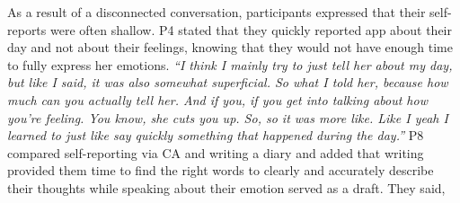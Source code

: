         As a result of a disconnected conversation, participants expressed that their self-reports were often shallow.
        P4 stated that they quickly reported \acl{app} about their day and not about their feelings, knowing that they would not have enough time to fully express her emotions.
                \textit{``I think I mainly try to just tell her about my day, but like I said, it was also somewhat superficial. So what I told her, because how much can you actually tell her. And if you, if you get into talking about how you're feeling. You know, she cuts you up. So, so it was more like. Like I yeah I learned to just like say quickly something that happened during the day.''}
        P8 compared self-reporting via \ac{CA} and writing a diary and added that writing provided them time to find the right words to clearly and accurately describe their thoughts while speaking about their emotion served as a draft.  
        They said,    
